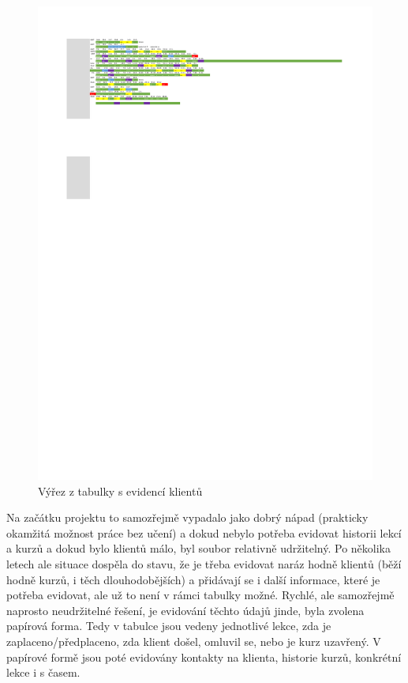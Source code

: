 \begin{figure}\centering
	\includegraphics[width=1\textwidth]{img/excel3}
	\caption[Tabulka s evidencí klientů]{Výřez z tabulky s evidencí klientů}\label{fig:excel}
\end{figure}

Na začátku projektu to samozřejmě vypadalo jako dobrý nápad (prakticky okamžitá možnost práce bez učení) a dokud nebylo potřeba evidovat historii lekcí a kurzů a dokud bylo klientů málo, byl soubor relativně udržitelný. Po několika letech ale situace dospěla do stavu, že je třeba evidovat naráz hodně klientů (běží hodně kurzů, i těch dlouhodobějších) a přidávají se i další informace, které je potřeba evidovat, ale už to není v rámci tabulky možné. Rychlé, ale samozřejmě naprosto neudržitelné řešení, je evidování těchto údajů jinde, byla zvolena papírová forma. Tedy v tabulce jsou vedeny jednotlivé lekce, zda je zaplaceno/předplaceno, zda klient došel, omluvil se, nebo je kurz uzavřený. V papírové formě jsou poté evidovány kontakty na klienta, historie kurzů, konkrétní lekce i s časem.

